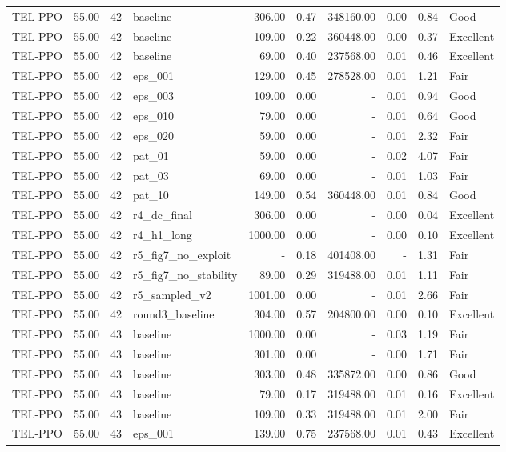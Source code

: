 \begin{table}[htbp]
\begin{tabular}{lrrlrrrrrl}
TEL-PPO & 55.00 & 42 & baseline & 306.00 & 0.47 & 348160.00 & 0.00 & 0.84 & Good \\
TEL-PPO & 55.00 & 42 & baseline & 109.00 & 0.22 & 360448.00 & 0.00 & 0.37 & Excellent \\
TEL-PPO & 55.00 & 42 & baseline & 69.00 & 0.40 & 237568.00 & 0.01 & 0.46 & Excellent \\
TEL-PPO & 55.00 & 42 & eps_001 & 129.00 & 0.45 & 278528.00 & 0.01 & 1.21 & Fair \\
TEL-PPO & 55.00 & 42 & eps_003 & 109.00 & 0.00 & - & 0.01 & 0.94 & Good \\
TEL-PPO & 55.00 & 42 & eps_010 & 79.00 & 0.00 & - & 0.01 & 0.64 & Good \\
TEL-PPO & 55.00 & 42 & eps_020 & 59.00 & 0.00 & - & 0.01 & 2.32 & Fair \\
TEL-PPO & 55.00 & 42 & pat_01 & 59.00 & 0.00 & - & 0.02 & 4.07 & Fair \\
TEL-PPO & 55.00 & 42 & pat_03 & 69.00 & 0.00 & - & 0.01 & 1.03 & Fair \\
TEL-PPO & 55.00 & 42 & pat_10 & 149.00 & 0.54 & 360448.00 & 0.01 & 0.84 & Good \\
TEL-PPO & 55.00 & 42 & r4_dc_final & 306.00 & 0.00 & - & 0.00 & 0.04 & Excellent \\
TEL-PPO & 55.00 & 42 & r4_h1_long & 1000.00 & 0.00 & - & 0.00 & 0.10 & Excellent \\
TEL-PPO & 55.00 & 42 & r5_fig7_no_exploit & - & 0.18 & 401408.00 & - & 1.31 & Fair \\
TEL-PPO & 55.00 & 42 & r5_fig7_no_stability & 89.00 & 0.29 & 319488.00 & 0.01 & 1.11 & Fair \\
TEL-PPO & 55.00 & 42 & r5_sampled_v2 & 1001.00 & 0.00 & - & 0.01 & 2.66 & Fair \\
TEL-PPO & 55.00 & 42 & round3_baseline & 304.00 & 0.57 & 204800.00 & 0.00 & 0.10 & Excellent \\
TEL-PPO & 55.00 & 43 & baseline & 1000.00 & 0.00 & - & 0.03 & 1.19 & Fair \\
TEL-PPO & 55.00 & 43 & baseline & 301.00 & 0.00 & - & 0.00 & 1.71 & Fair \\
TEL-PPO & 55.00 & 43 & baseline & 303.00 & 0.48 & 335872.00 & 0.00 & 0.86 & Good \\
TEL-PPO & 55.00 & 43 & baseline & 79.00 & 0.17 & 319488.00 & 0.01 & 0.16 & Excellent \\
TEL-PPO & 55.00 & 43 & baseline & 109.00 & 0.33 & 319488.00 & 0.01 & 2.00 & Fair \\
TEL-PPO & 55.00 & 43 & eps_001 & 139.00 & 0.75 & 237568.00 & 0.01 & 0.43 & Excellent \\

\end{tabular}
\end{table}
